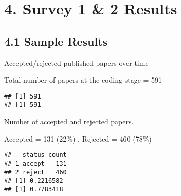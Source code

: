 \documentclass[
]{article}
\newenvironment{Shaded}{\begin{snugshade}}{\end{snugshade}}
\newcommand{\CommentTok}[1]{\textcolor[rgb]{0.56,0.35,0.01}{\textit{#1}}}
\newcommand{\DataTypeTok}[1]{\textcolor[rgb]{0.13,0.29,0.53}{#1}}
\newcommand{\KeywordTok}[1]{\textcolor[rgb]{0.13,0.29,0.53}{\textbf{#1}}}
\newcommand{\NormalTok}[1]{#1}
\newcommand{\OperatorTok}[1]{\textcolor[rgb]{0.81,0.36,0.00}{\textbf{#1}}}
\newcommand{\StringTok}[1]{\textcolor[rgb]{0.31,0.60,0.02}{#1}}
\begin{document}
\hypertarget{survey-1-2-results}{%
\section{4. Survey 1 \& 2 Results}\label{survey-1-2-results}}

\hypertarget{sample-results}{%
\subsection{4.1 Sample Results}\label{sample-results}}

Accepted/rejected published papers over time

Total number of papers at the coding stage = 591

\begin{Shaded}
\end{Shaded}

\begin{verbatim}
## [1] 591
## [1] 591
\end{verbatim}

Number of accepted and rejected papers.

Accepted = 131 (22\%) , Rejected = 460 (78\%)

\begin{Shaded}
\end{Shaded}

\begin{verbatim}
##   status count
## 1 accept   131
## 2 reject   460
## [1] 0.2216582
## [1] 0.7783418
\end{verbatim}
\end{document}
